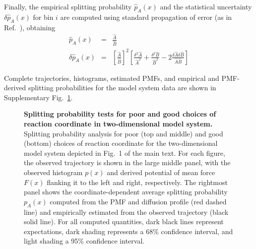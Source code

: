\documentclass[aps,prl,twocolumn,superscriptaddress,floatfix]{revtex4-1}
\begin{document}
Finally, the empirical splitting probability $\hat{p}_A(x)$ and the statistical uncertainty $\delta \hat{p}_A(x)$ for bin $i$ are computed using standard propagation of error (as in Ref.~\cite{chodera:jctc:2007}), obtaining 
\begin{eqnarray}
\hat{p}_A(x) &=& \frac{\hat{A}}{\hat{B}} \nonumber \\
\delta \hat{p}_A(x) &=& \left[ \frac{\hat{A}}{\hat{B}} \right]^2 \left[ \frac{\delta^2 \hat{A}}{\hat{A}^2} + \frac{\delta^2 \hat{B}}{\hat{B}^2} - 2 \frac{\delta \hat{A} \delta \hat{B}}{\hat{A} \hat{B}} \right]
\end{eqnarray}

Complete trajectories, histograms, estimated PMFs, and empirical and PMF-derived splitting probabilities for the model system data are shown in Supplementary Fig.~\ref{figure:model-trajectories}.

\begin{figure}[tbp]
\caption{\label{figure:model-splitting-comparison} {\bf Splitting probability tests for poor and good choices of reaction coordinate in two-dimensional model system.}
Splitting probability analysis for poor (top and middle) and good (bottom) choices of reaction coordinate for the two-dimensional model system depicted in Fig.~1 of the main text.
For each figure, the observed trajectory is shown in the large middle panel, with the observed histogram $p(x)$ and derived potential of mean force $F(x)$ flanking it to the left and right, respectively. 
The rightmost panel shows the coordinate-dependent average splitting probability $p_A(x)$ computed from the PMF and diffusion profile (red dashed line) and empirically estimated from the observed trajectory (black solid line).
For all computed quantities, dark black lines represent expectations, dark shading represents a 68\% confidence interval, and light shading a 95\% confidence interval.
}
\label{figure:model-trajectories}
\end{figure}
\end{document}
